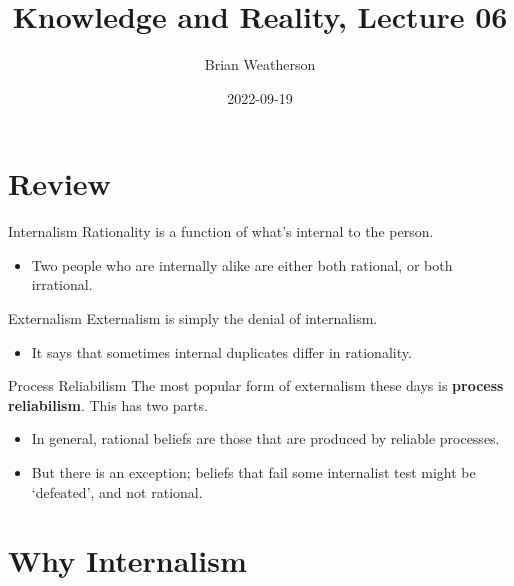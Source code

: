 \documentclass[
  17pt,
  letterpaper,
  ignorenonframetext,
  aspectratio=169,
]{beamer}
\title{Knowledge and Reality, Lecture 06}
\author{Brian Weatherson}
\date{2022-09-19}
\providecommand{\tightlist}{%
  \setlength{\itemsep}{0pt}\setlength{\parskip}{0pt}}\usepackage{longtable,booktabs,array}
\begin{document}
\frame{\titlepage}
\ifdefined\Shaded\renewenvironment{Shaded}{\begin{tcolorbox}[interior hidden, breakable, enhanced, sharp corners, boxrule=0pt, borderline west={3pt}{0pt}{shadecolor}, frame hidden]}{\end{tcolorbox}}\fi

\hypertarget{review}{%
\section{Review}\label{review}}

\begin{frame}{Internalism}
\protect\hypertarget{internalism}{}
Rationality is a function of what's internal to the person.

\begin{itemize}[<+->]
\tightlist
\item
  Two people who are internally alike are either both rational, or both
  irrational.
\end{itemize}
\end{frame}

\begin{frame}{Externalism}
\protect\hypertarget{externalism}{}
Externalism is simply the denial of internalism.

\begin{itemize}[<+->]
\tightlist
\item
  It says that sometimes internal duplicates differ in rationality.
\end{itemize}
\end{frame}

\begin{frame}{Process Reliabilism}
\protect\hypertarget{process-reliabilism}{}
The most popular form of externalism these days is \textbf{process
reliabilism}. This has two parts.

\begin{itemize}[<+->]
\tightlist
\item
  In general, rational beliefs are those that are produced by reliable
  processes.
\item
  But there is an exception; beliefs that fail some internalist test
  might be `defeated', and not rational.
\end{itemize}
\end{frame}

\hypertarget{why-internalism}{%
\section{Why Internalism}\label{why-internalism}}
\end{document}
